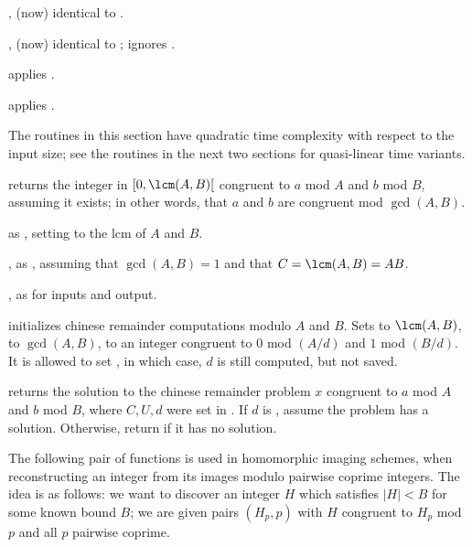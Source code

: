 , (now) identical to .

, (now) identical to
; ignores \fl.

 applies .

 applies .

The routines in this section have quadratic time complexity with respect to
the input size; see the routines in the next two sections for quasi-linear
time variants.

 returns the integer
in $[0, \lcm(A,B)[$ congruent to $a$ mod $A$ and $b$ mod $B$, assuming it
exists; in other words, that $a$ and $b$ are congruent mod $\gcd(A,B)$.

 as
, setting  to the lcm of $A$ and $B$.

, as
, assuming that $\gcd(A,B) = 1$ and that $C = \lcm(A,B) = AB$.

, as
 for  inputs and output.

initializes chinese remainder computations modulo $A$ and $B$. Sets
 to $\lcm(A,B)$,  to $\gcd(A,B)$,
 to an integer congruent to $0$ mod $(A/d)$ and $1$ mod $(B/d)$.
It is allowed to set , in which case, $d$ is still
computed, but not saved.

 returns
the solution to the chinese remainder problem $x$ congruent
to $a$ mod $A$ and $b$ mod $B$, where $C, U, d$ were set in
. If $d$ is , assume the problem has a
solution. Otherwise, return  if it has no solution.

\medskip

The following pair of functions is used in homomorphic imaging schemes,
when reconstructing an integer from its images modulo pairwise coprime
integers. The idea is as follows: we want to discover an integer $H$ which
satisfies $|H| < B$ for some known bound $B$; we are given pairs $(H_p, p)$
with $H$ congruent to $H_p$ mod $p$ and all $p$ pairwise coprime.

